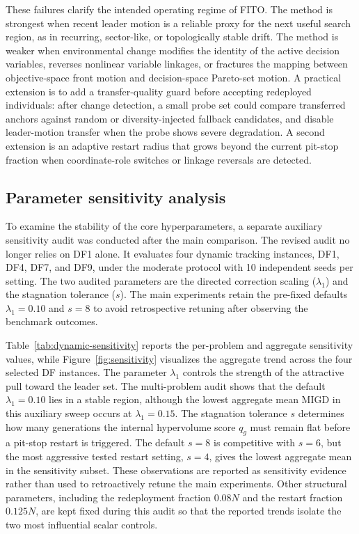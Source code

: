 \documentclass[preprint,12pt]{elsarticle}
\begin{document}
These failures clarify the intended operating regime of FITO. The method is strongest when recent leader motion is a reliable proxy for the next useful search region, as in recurring, sector-like, or topologically stable drift. The method is weaker when environmental change modifies the identity of the active decision variables, reverses nonlinear variable linkages, or fractures the mapping between objective-space front motion and decision-space Pareto-set motion. A practical extension is to add a transfer-quality guard before accepting redeployed individuals: after change detection, a small probe set could compare transferred anchors against random or diversity-injected fallback candidates, and disable leader-motion transfer when the probe shows severe degradation. A second extension is an adaptive restart radius that grows beyond the current pit-stop fraction when coordinate-role switches or linkage reversals are detected.

\subsection{Parameter sensitivity analysis}
\label{subsec:sensitivity}

To examine the stability of the core hyperparameters, a separate auxiliary sensitivity audit was conducted after the main comparison. The revised audit no longer relies on DF1 alone. It evaluates four dynamic tracking instances, DF1, DF4, DF7, and DF9, under the moderate protocol with 10 independent seeds per setting. The two audited parameters are the directed correction scaling ($\lambda_1$) and the stagnation tolerance ($s$). The main experiments retain the pre-fixed defaults $\lambda_1=0.10$ and $s=8$ to avoid retrospective retuning after observing the benchmark outcomes.



Table~\ref{tab:dynamic-sensitivity} reports the per-problem and aggregate sensitivity values, while Figure~\ref{fig:sensitivity} visualizes the aggregate trend across the four selected DF instances. The parameter $\lambda_1$ controls the strength of the attractive pull toward the leader set. The multi-problem audit shows that the default $\lambda_1=0.10$ lies in a stable region, although the lowest aggregate mean MIGD in this auxiliary sweep occurs at $\lambda_1=0.15$. The stagnation tolerance $s$ determines how many generations the internal hypervolume score $q_g$ must remain flat before a pit-stop restart is triggered. The default $s=8$ is competitive with $s=6$, but the most aggressive tested restart setting, $s=4$, gives the lowest aggregate mean in the sensitivity subset. These observations are reported as sensitivity evidence rather than used to retroactively retune the main experiments. Other structural parameters, including the redeployment fraction $0.08N$ and the restart fraction $0.125N$, are kept fixed during this audit so that the reported trends isolate the two most influential scalar controls.
\end{document}
